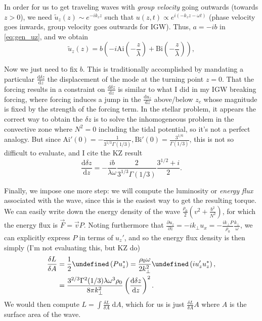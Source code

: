 \documentclass[11pt,
        usenames, %
        dvipsnames %
    ]{article}
\newcommand*{\rd}[2]{\frac{\mathrm{d}#1}{\mathrm{d}#2}}
\newcommand*{\pd}[2]{\frac{\partial#1}{\partial#2}}
\newcommand*{\p}[1]{\left(#1\right)}
\let\Re\undefined
\DeclareMathOperator{\Re}{Re}
\begin{document}
In order for us to get traveling waves with \emph{group velocity} going outwards
(towards $z > 0$), we need $\tilde{u}_z(z) \sim e^{-ik_zz}$ such that $u(z, t)
\propto e^{i\p{-k_zz - \omega t}}$ (phase velocity goes inwards, group velocity
goes outwards for IGW). Thus, $a = -ib$ in \autoref{eq:gen_uz}, and we obtain
\begin{equation}
    \tilde{u}_z(z) = b\p{-i\mathrm{Ai}\p{-\frac{z}{\lambda}}
        + \mathrm{Bi}\p{-\frac{z}{\lambda}}},\label{eq:gen_uz}
\end{equation}

Now we just need to fix $b$. This is traditionally accomplished by mandating a
particular $\rd{\delta z}{z}$ the displacement of the mode at the turning point
$z = 0$. That the forcing results in a constraint on $\rd{\delta z}{z}$ is
similar to what I did in my IGW breaking forcing, where forcing induces a jump
in the $\rd{u_z}{z}$ above/below $z_c$ whose magnitude is fixed by the strength
of the forcing term. In the stellar problem, it appears the correct way to
obtain the $\delta z$ is to solve the inhomogeneous problem in the convective
zone where $N^2 = 0$ including the tidal potential, so it's not a perfect
analogy. But since $\mathrm{Ai}'(0) = -\frac{1}{3^{1/3}\Gamma(1/3)},
\mathrm{Bi}'(0) = \frac{3^{1/6}}{\Gamma(1/3)}$, this is not so difficult to
evaluate, and I cite the KZ result
\begin{equation}
    \rd{\delta z}{z} = -\frac{ib}{\lambda \omega}\frac{2}{3^{1/3}\Gamma(1/3)}
        \frac{3^{1/2} + i}{2}.
\end{equation}

Finally, we impose one more step: we will compute the luminosity or \emph{energy
flux} associated with the wave, since this is the easiest way to get the
resulting torque. We can easily write down the energy density of the wave
$\frac{\rho_0}{2}\p{v^2 + \frac{b^2}{N^2}}$, for which the energy flux is
$\vec{F} = \vec{v}P$. Noting furthermore that $\pd{u_z}{z} = -ik_\perp u_x =
-\frac{ik_\perp P}{\rho_0}\frac{k_\perp }{\omega}$, we can explicitly express
$P$ in terms of $u_z'$, and so the energy flux density is then simply (I'm not
evaluating this, but KZ do)
\begin{align}
    \frac{\delta L}{\delta A} &= \frac{1}{2}\Re\p{P u_z^*}
            = \frac{\rho_0 \omega}{2k_\perp^2} \Re\p{iu_z'u_z^*},\\
        &= \frac{3^{2/3}\Gamma^2(1/3) \lambda \omega^3 \rho_0}{8\pi k_\perp^2}
            \p{\rd{\delta z}{z}}^2.
\end{align}
We would then compute $L = \int \frac{\delta L}{\delta A}\;\mathrm{d}A$, which
for us is just $\frac{\delta L}{\delta A}A$ where $A$ is the surface area of the
wave.
\end{document}
